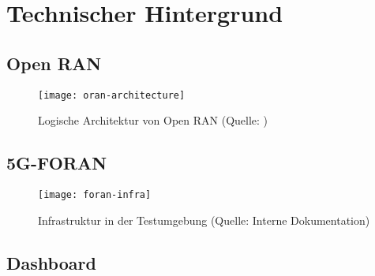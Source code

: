 \chapter{Technischer Hintergrund}
\label{chap:technischerHintergrund}
\section{Open RAN}
\label{sec:tech-oran}
\begin{figure}[H]
    \centering
    \texttt{[image: oran-architecture]}
    \caption{Logische Architektur von Open RAN (Quelle: \autocite{o-ranworkgroup1usecasesandoverallarchitectureORANArchitectureDescription})}
    \label{fig:oran-architecture}
\end{figure}
\section{5G-FORAN}
\label{sec:tech-foran}
\begin{figure}
    \centering
    \texttt{[image: foran-infra]}
    \caption{Infrastruktur in der Testumgebung (Quelle: Interne Dokumentation)}
    \label{fig:foran-infra}
\end{figure}
\section{Dashboard}
\label{sec:tech-dashboard}

